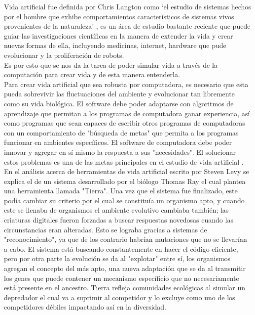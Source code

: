 \documentclass[conference]{IEEEtran}
\begin{document}
Vida artificial fue definida por Chris Langton como `el estudio de sistemas hechos por el hombre que exhibe comportamientos caracter\'isticos de sistemas vivos provenientes de la naturaleza' \cite{JDOY01}, es un \'area de estudio bastante reciente que puede guiar las investigaciones cient\'ificas en la manera de extender la vida y crear nuevas formas de ella, incluyendo medicinas, internet, hardware que pude evolucionar y la proliferaci\'on de robots. \cite{PROB01}\\
Es por esto que se nos da la tarea de poder simular vida a trav\'es de la computaci\'on para crear vida y de esta manera entenderla. \cite{artificiallifeLevy}  \\
Para crear vida artificial que sea robusta por computadora, es necesario que esta pueda sobrevivir las fluctuaciones del ambiente y evolucionar tan libremente como su vida biol\'ogica. El software debe poder adaptarse con algoritmos de aprendizaje que permitan a los programas de computadora ganar experiencia, as\'i como programas que sean capaces de escribir otros programas de computadoras con un comportamiento de "b\'usqueda de metas" que permita a los programas funcionar en ambientes espec\'ificos. El software de computadora debe poder innovar y agregar en s\'i mismo la respuesta a sus "necesidades". El solucionar estos problemas es una de las metas principales en el estudio de vida artificial \cite{JDOY01}.\\
En el an\'alisis acerca de herramientas de vida artificial escrito por Steven Levy se explica el de un sistema desarrollado por el bi\'ologo Thomas Ray el cual plantea una herramienta llamada "Tierra". Una vez que el sistema fue finalizado, este pod\'ia cambiar su criterio por el cual se constitu\'ia un organismo apto, y cuando este se llenaba de organismos el ambiente evolutivo cambiaba tambi\'en; las criaturas digitales fueron forzadas a buscar respuestas novedosas cuando las circunstancias eran alteradas. Esto se lograba gracias a sistemas de "reconocimiento", ya que de los contrario habr\'ian mutaciones que no se llevar\'ian a cabo. El sistema est\'a buscando constantemente en hacer el c\'odigo eficiente, pero por otra parte la evoluci\'on se da al "explotar" entre s\'i, los organismos agregan el concepto del m\'as apto, una nueva adaptaci\'on que se da al transmitir los genes que puede contener un mecanismo espec\'ificio que no necesariamente est\'a presente en el ancestro. Tierra refleja comunidades ecol\'ogicas al simular un depredador el cual va a suprimir al competidor y lo excluye como uno de los competidores d\'ebiles impactando as\'i en la diversidad. \cite{STEV01} \\
\end{document}
